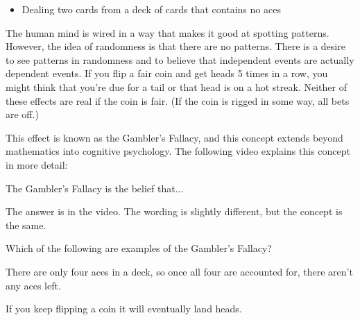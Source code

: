 \documentclass{ximera}
\begin{document}
\begin{question}
\begin{itemize}
\item Dealing two cards from a deck of cards that contains no aces
\end{itemize}
\begin{multipleChoice}
\end{multipleChoice}

\end{question}

The human mind is wired in a way that makes it good at spotting patterns. However, the idea of randomness is that there are no patterns. There is a desire to see patterns in randomness and to believe that independent events are actually dependent events. If you flip a fair coin and get heads 5 times in a row, you might think that you're due for a tail or that head is on a hot streak. Neither of these effects are real if the coin is fair. (If the coin is rigged in some way, all bets are off.)

This effect is known as the Gambler's Fallacy, and this concept extends beyond mathematics into cognitive psychology. The following video explains this concept in more detail: 



\begin{question}
The Gambler's Fallacy is the belief that...

    \begin{hint}
    The answer is in the video. The wording is slightly different, but the concept is the same.
    \end{hint}
    \begin{multipleChoice}
      \end{multipleChoice}

\end{question}

\begin{question}
Which of the following are examples of the Gambler's Fallacy?
    \begin{hint}
    There are only four aces in a deck, so once all four are accounted for, there aren't any aces left.
    \end{hint}
    \begin{hint}
    If you keep flipping a coin it will eventually land heads.
    \end{hint}
    \begin{multipleChoice}
      \end{multipleChoice}

\end{question}
\end{document}
